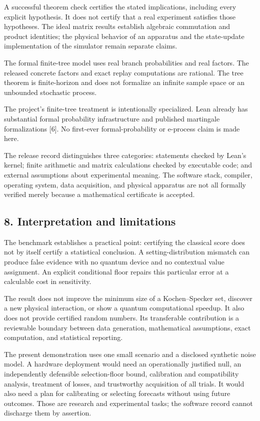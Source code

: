 \documentclass[10pt,a4paper]{article}
\begin{document}
A successful theorem check certifies the stated implications, including
every explicit hypothesis. It does not certify that a real experiment
satisfies those hypotheses. The ideal matrix results establish algebraic
commutation and product identities; the physical behavior of an
apparatus and the state-update implementation of the simulator remain
separate claims.

The formal finite-tree model uses real branch probabilities and real
factors. The released concrete factors and exact replay computations are
rational. The tree theorem is finite-horizon and does not formalize an
infinite sample space or an unbounded stochastic process.

The project's finite-tree treatment is intentionally specialized. Lean
already has substantial formal probability infrastructure and published
martingale formalizations {[}6{]}. No first-ever formal-probability or
e-process claim is made here.

The release record distinguishes three categories: statements checked by
Lean's kernel; finite arithmetic and matrix calculations checked by
executable code; and external assumptions about experimental meaning.
The software stack, compiler, operating system, data acquisition, and
physical apparatus are not all formally verified merely because a
mathematical certificate is accepted.

\subsection{8. Interpretation and
limitations}\label{interpretation-and-limitations}

The benchmark establishes a practical point: certifying the classical
score does not by itself certify a statistical conclusion. A
setting-distribution mismatch can produce false evidence with no quantum
device and no contextual value assignment. An explicit conditional floor
repairs this particular error at a calculable cost in sensitivity.

The result does not improve the minimum size of a Kochen--Specker set,
discover a new physical interaction, or show a quantum computational
speedup. It also does not provide certified random numbers. Its
transferable contribution is a reviewable boundary between data
generation, mathematical assumptions, exact computation, and statistical
reporting.

The present demonstration uses one small scenario and a disclosed
synthetic noise model. A hardware deployment would need an operationally
justified null, an independently defensible selection-floor bound,
calibration and compatibility analysis, treatment of losses, and
trustworthy acquisition of all trials. It would also need a plan for
calibrating or selecting forecasts without using future outcomes. Those
are research and experimental tasks; the software record cannot
discharge them by assertion.
\end{document}
